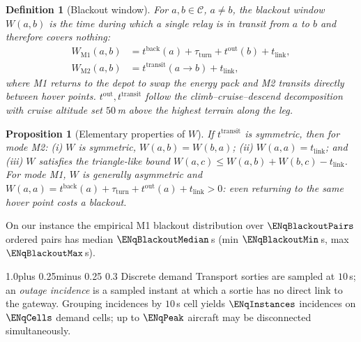 \documentclass[11pt]{article}
\makeatletter
\def\subsection{\@startsection{subsection}{2}{\z@}%
    {1.0\baselineskip plus 0.25\baselineskip minus 0.25\baselineskip}%
    {0.3\baselineskip}%
    {\normalfont\normalsize\itshape}}%
\theoremstyle{dshplain}
\newtheorem{proposition}[theorem]{Proposition}
\theoremstyle{dshdefn}
\newtheorem{definition}[theorem]{Definition}
\makeatother
\begin{document}
\begin{definition}[Blackout window]\label{def:blackout}
For $a,b\in\mathcal{C}$, $a\neq b$, the \emph{blackout window} $W(a,b)$ is the
time during which a single relay is in transit from $a$ to $b$ and therefore
covers nothing:
\begin{align}
W_{\mathrm{M1}}(a,b) &= t^{\mathrm{back}}(a) + \tau_{\mathrm{turn}}
  + t^{\mathrm{out}}(b) + t_{\mathrm{link}},\\
W_{\mathrm{M2}}(a,b) &= t^{\mathrm{transit}}(a\to b) + t_{\mathrm{link}},
\end{align}
where M1 returns to the depot to swap the energy pack and M2 transits directly
between hover points. $t^{\mathrm{out}},t^{\mathrm{transit}}$ follow the
climb--cruise--descend decomposition with cruise altitude set
$50$\,m above the highest terrain along the leg.
\end{definition}

\begin{proposition}[Elementary properties of $W$]
\label{prop:W}
If $t^{\mathrm{transit}}$ is symmetric, then for mode M2: (i) $W$ is symmetric,
$W(a,b)=W(b,a)$; (ii) $W(a,a)=t_{\mathrm{link}}$; and (iii) $W$ satisfies the
triangle-like bound $W(a,c)\le W(a,b)+W(b,c)-t_{\mathrm{link}}$. For mode M1,
$W$ is generally asymmetric and $W(a,a)=t^{\mathrm{back}}(a)+\tau_{\mathrm{turn}}
+t^{\mathrm{out}}(a)+t_{\mathrm{link}}>0$: \emph{even returning to the same
hover point costs a blackout}.
\end{proposition}
\noindent On our instance the empirical M1 blackout distribution over
$\ENqBlackoutPairs$ ordered pairs has median $\ENqBlackoutMedian$\,s
(min $\ENqBlackoutMin$\,s, max $\ENqBlackoutMax$\,s).

\subsection{Discrete demand}
Transport sorties are sampled at $10$\,s; an \emph{outage incidence} is a
sampled instant at which a sortie has no direct link to the gateway. Grouping
incidences by $10$\,s cell yields $\ENqInstances$ incidences on
$\ENqCells$ demand cells; up to $\ENqPeak$ aircraft may be disconnected
simultaneously.
\end{document}
